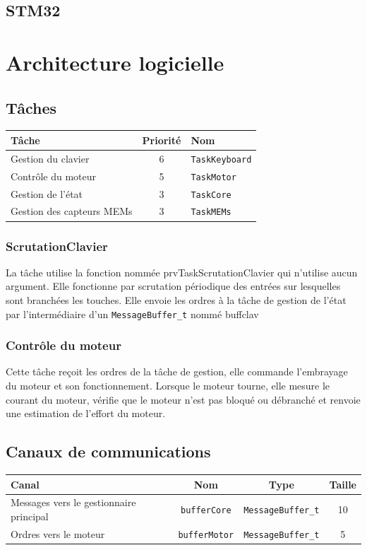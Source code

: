 \documentclass[a4paper,11pt]{report}
\begin{document}
\section{STM32}

\chapter{Architecture logicielle}

\section{Tâches}
\begin{tabular}{|l|c|l|}
\hline 
Tâche & Priorité & Nom \\
\hline 
Gestion du clavier & 6 & \texttt{TaskKeyboard}\\
Contrôle du moteur & 5 & \texttt{TaskMotor}\\
Gestion de l'état & 3 & \texttt{TaskCore}\\
Gestion des capteurs MEMs & 3 & \texttt{TaskMEMs}\\
\hline 
\end{tabular} 
\subsection{ScrutationClavier}
La tâche utilise la fonction nommée prvTaskScrutationClavier qui n'utilise aucun argument.  Elle fonctionne par scrutation périodique des entrées sur lesquelles sont branchées les touches.  Elle envoie les ordres à la tâche de gestion de l'état par l'intermédiaire d'un \texttt{MessageBuffer\_t} nommé buffclav
\subsection{Contrôle du moteur}
Cette tâche reçoit les ordres de la tâche de gestion, elle commande l'embrayage du moteur et son fonctionnement. Lorsque le moteur tourne, elle mesure le courant du moteur, vérifie que le moteur n'est pas bloqué ou débranché et renvoie une estimation de l'effort du moteur.
\section{Canaux de communications}

\begin{tabular}{|l|c|c|c|}
\hline
Canal & Nom & Type & Taille \\
\hline
Messages vers le gestionnaire principal & \texttt{bufferCore} & \texttt{MessageBuffer\_t} & 10 \\
\hline 
Ordres vers le moteur & \texttt{bufferMotor} & \texttt{MessageBuffer\_t} & 5 \\ 
\hline
\end{tabular}
\end{document}
